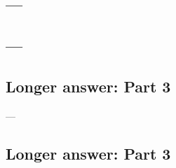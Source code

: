 \documentclass[
  letterpaper,
  DIV=11,
  numbers=noendperiod]{scrartcl}
\begin{document}
\hypertarget{section-12}{%
\subsection{---}\label{section-12}}

\hypertarget{section-13}{%
\subsection{---}\label{section-13}}

\hypertarget{longer-answer-part-3}{%
\subsection{\texorpdfstring{\textbf{Longer answer:} Part
3}{Longer answer: Part 3}}\label{longer-answer-part-3}}

---

\hypertarget{section-14}{%
\subsection{}\label{section-14}}

\hypertarget{section-15}{%
\subsection{}\label{section-15}}

\hypertarget{section-16}{%
\subsection{}\label{section-16}}

\hypertarget{longer-answer-part-3-1}{%
\subsection{\texorpdfstring{\textbf{Longer answer:} Part
3}{Longer answer: Part 3}}\label{longer-answer-part-3-1}}

\hypertarget{section-17}{%
\subsection{}\label{section-17}}

\hypertarget{section-18}{%
\subsection{}\label{section-18}}

\hypertarget{section-19}{%
\subsection{}\label{section-19}}
\end{document}
